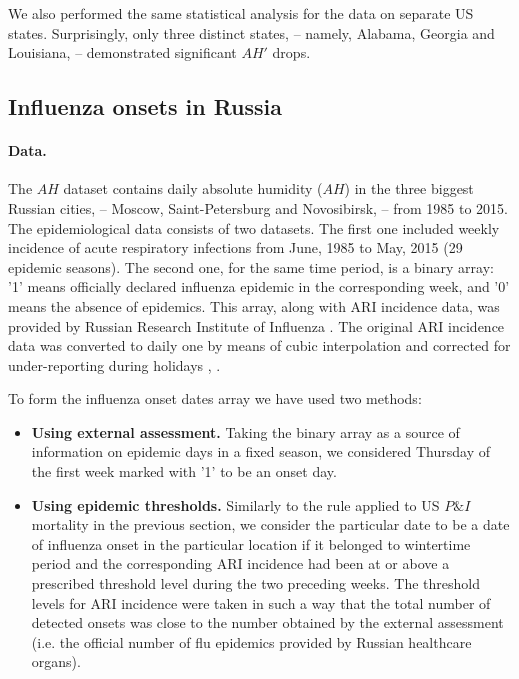 \documentclass[procedia]{easychair}
\begin{document}
We also performed the same statistical analysis for the data on separate US states. Surprisingly, only three distinct states, -- namely, Alabama, Georgia and Louisiana, -- demonstrated significant $AH'$ drops.


\subsection{Influenza onsets in Russia}

\paragraph{Data.}
The $AH$ dataset contains daily absolute humidity ($AH$) in the three biggest Russian cities, -- Moscow, Saint-Petersburg and Novosibirsk, -- from 1985 to 2015. The epidemiological data consists of two datasets. The first one included weekly incidence of acute respiratory infections from June, 1985 to May, 2015 (29 epidemic seasons). The second one, for the same time period, is a binary array: '1' means officially declared influenza epidemic in the corresponding week, and '0' means the absence of epidemics. This array, along with ARI incidence data, was provided by Russian Research Institute of Influenza \cite{fluinst_link}. The original ARI incidence data was converted to daily one by means of cubic interpolation and corrected for under-reporting during holidays \cite{baroyan1970computer}, \cite{Leonenko2016}.  

To form the influenza onset dates array we have used two methods:
\begin{itemize}
\item \textbf{Using external assessment.} Taking the binary array as a source of information on epidemic days in a fixed season, we considered Thursday of the first week marked with '1' to be an onset day.
\item \textbf{Using epidemic thresholds.} Similarly to the rule applied to US $P\&I$ mortality in the previous section, we consider the particular date to be a date of influenza onset in the particular location if it belonged to wintertime period and the corresponding ARI incidence had been at or above a prescribed threshold level during the two preceding weeks. The threshold levels for ARI incidence were taken in such a way that the total number of detected onsets was close to the number obtained by the external assessment (i.e. the official number of flu epidemics provided by Russian healthcare organs). 
\end{itemize}
\end{document}
